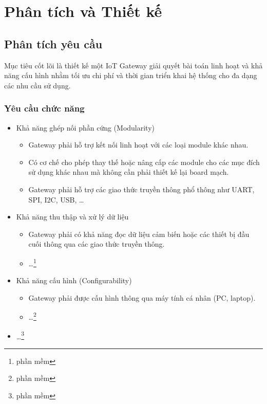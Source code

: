 \chapter{Phân tích và Thiết kế}
    \section{Phân tích yêu cầu}
        Mục tiêu cốt lõi là thiết kế một IoT Gateway giải quyết bài toán linh hoạt và khả năng cấu hình nhằm tối ưu chi phí và thời gian triển khai hệ thống cho đa dạng các nhu cầu sử dụng.

        \subsection{Yêu cầu chức năng}
            \begin{itemize}
                \item Khả năng ghép nối phần cứng (Modularity)
                \begin{itemize}
                    \item Gateway phải hỗ trợ kết nối linh hoạt với các loại module khác nhau.
                    \item Có cơ chế cho phép thay thế hoặc nâng cấp các module cho các mục đích sử dụng khác nhau mà không cần phải thiết kế lại board mạch.
                    \item Gateway phải hỗ trợ các giao thức truyền thông phổ thông như UART, SPI, I2C, USB, \dots
                \end{itemize}
                \item Khả năng thu thập và xử lý dữ liệu
                \begin{itemize}
                    \item Gateway phải có khả năng đọc dữ liệu cảm biến hoặc các thiết bị đầu cuối thông qua các giao thức truyền thông.
                    \item \dots\footnote{phần mềm}
                \end{itemize}
                \item Khả năng cấu hình (Configurability)
                \begin{itemize}
                    \item Gateway phải được cấu hình thông qua máy tính cá nhân (PC, laptop).
                    \item \dots\footnote{phần mềm}
                \end{itemize}
                \item \dots\footnote{phần mềm}
            \end{itemize}

